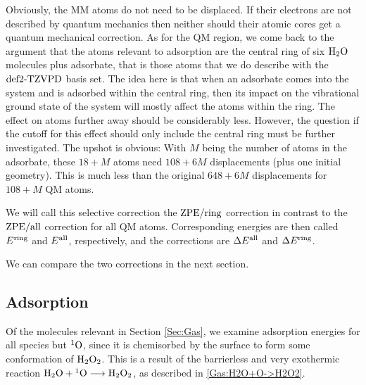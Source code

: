 \documentclass[8.5pt,twoside,twocolumn]{article}
\newcommand\zpe{\enmat{\te{ZPE}}}
\newcommand\ering{\enmat{E^{\te{ring}}}}
\newcommand\eall{\enmat{E^{\te{all}}}}
\newcommand\zpering{\enmat{\zpe/\te{ring}}}
\newcommand\zpeall{\enmat{\zpe/\te{all}}}
\newcommand\singo{\enmat{{^1\te{O}}}}
\theoremstyle{standard}
\begin{document}
Obviously, the MM atoms do not need to be displaced. If their electrons are not
described by quantum mechanics then neither should their atomic cores get a
quantum mechanical correction. As for the QM region, we come back to the argument that
the atoms relevant to adsorption are the central ring of six $\text H _2 \text O$ molecules plus adsorbate,
that is those atoms that we do describe with the $\text{def2-TZVPD}$ basis set. The idea
here is that when an adsorbate comes into the system and is adsorbed within the
central ring, then its impact on the vibrational ground state of the system
will mostly affect the atoms within the ring. The effect on atoms further
away should be considerably less. However, the question if the cutoff for this effect
should only include the central ring must be further investigated. The
upshot is obvious: With $M$ being the number of atoms in the adsorbate, these $18+M$ atoms
need $108+6M$ displacements (plus one initial geometry). This is much less than
the original $648+6M$ displacements for $108+M$ QM atoms.

We will call this selective correction the $\zpering$ correction in contrast to
the $\zpeall$ correction for all QM atoms. Corresponding energies are then called
$\ering$ and $\eall$, respectively, and the corrections are $\Dl\eall$ and $\Dl\ering$. 

We can compare the two corrections in the next section.



\subsection{Adsorption}
\label{Sec:Ads:Adsorption}
\newcommand\avg{\enmat{E_{\te {avg}}^{\te{ads}}}}
Of the molecules relevant in Section \ref{Sec:Gas}, we examine adsorption
energies for all species but $\singo$, since it is chemisorbed by the surface
to form some conformation of $\text H _2 \text O_2$. This is a result of the barrierless
and very exothermic reaction \mbox{$\hto+\singo\chemar\htot$}, as described in
\eqref{Gas:H2O+O->H2O2}.
\end{document}
